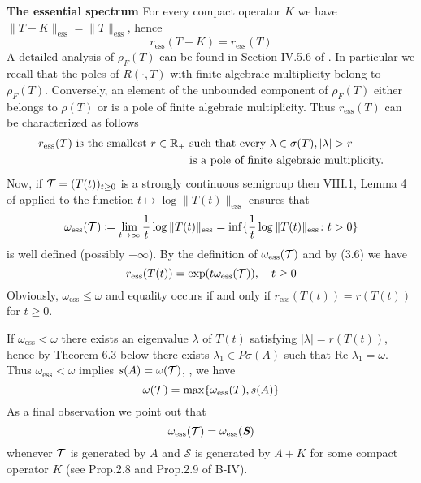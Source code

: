 \begin{example}{\textbf{The essential spectrum}}
For every compact operator $K$ we have $\|T - K\|_{\text{ess}} = \|T\|_{\text{ess}}$, hence
\begin{equation}\label{eq:a3-3.6}
r_{\text{ess}}(T - K) = r_{\text{ess}}(T)
\end{equation}
A detailed analysis of $\rho_{F}(T)$ can be found in Section IV.5.6 of \citet{kato:1966}.
In particular we recall that the poles of $R(\cdot,T)$ with finite algebraic multiplicity belong to $\rho_{F}(T)$.
Conversely, an element of the unbounded component of $\rho_{F}(T)$ either belongs to $\rho(T)$ or is a pole of finite algebraic multiplicity.
Thus $r_{\text{ess}}(T)$ can be characterized as follows
\begin{equation}\label{eq:a3-3.7}
\begin{split}
r_{\text{ess}}(T) \text{ is the smallest } r \in \mathbb{R}_{+}
& \text{ such that every } \lambda \in \sigma(T), |\lambda| > r \\
& \text{ is a pole of finite algebraic multiplicity.}
\end{split}
\end{equation}
Now, if $\mathcal{T} = (T(t))_{t \geq 0}$ is a strongly continuous semigroup then VIII.1, Lemma 4 of \citet{dunfordschwartz:1958} applied to the function $t \mapsto \log \|T(t)\|_{\text{ess}}$ ensures that
\begin{equation}\label{eq:a3-3.8}
\omega_{\text{ess}}(\mathcal{T}) \coloneqq \lim_{t \to \infty} \frac{1}{t} \log\|T(t)\|_{\text{ess}} = \inf \{\frac{1}{t} \log\|T(t)\|_{\text{ess}} \colon t > 0\}
\end{equation}
is well defined (possibly $-\infty$).
By the definition of $\omega_{\text{ess}}(\mathcal{T})$ and by (3.6) we have
\begin{equation}\label{eq:a3-3.9}
r_{\text{ess}}(T(t)) = \exp(t\omega_{\text{ess}}(\mathcal{T})), \quad t \geq 0
\end{equation}
Obviously, $\omega_{\text{ess}} \leq \omega$ and equality occurs if and only if $r_{\text{ess}}(T(t)) = r(T(t))$ for $t \geq 0$.

If $\omega_{\text{ess}} < \omega$ there exists an eigenvalue $\lambda$ of $T(t)$ satisfying $|\lambda| = r(T(t))$, hence by Theorem 6.3 below there exists $\lambda_{1} \in P\sigma(A)$ such that $\text{Re }\lambda_{1} = \omega$.
Thus $\omega_{\text{ess}} < \omega$ implies $s(A) = \omega(\mathcal{T})$, \ie, we have
\begin{equation}\label{eq:a3-3.10}
\omega(\mathcal{T}) = \max\{\omega_{\text{ess}}(T),s(A)\}
\end{equation}
As a final observation we point out that
\begin{equation}\label{eq:a3-3.11}
\omega_{\text{ess}}(\mathcal{T}) = \omega_{\text{ess}}({\textit{\textbf S}})
\end{equation}
whenever $\mathcal{T}$ is generated by $A$ and $\mathcal{S}$ is generated by $A + K$ for some compact operator $K$ (see Prop.2.8 and Prop.2.9 of B-IV).
\end{example}
